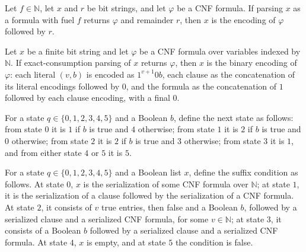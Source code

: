 \begin{theorem}
\label{Std.Sat.CNF.parseClauses_repr}
\leanok
{}
Let $f\in\mathbb{N}$, let $x$ and $r$ be bit strings, and let $\varphi$ be a CNF
formula. If parsing $x$ as a formula with fuel $f$ returns $\varphi$ and remainder $r$,
then $x$ is the encoding of $\varphi$ followed by $r$.
\end{theorem}

\begin{theorem}
\label{Std.Sat.CNF.parse_repr}
\leanok
{}
Let $x$ be a finite bit string and let $\varphi$ be a CNF formula over variables indexed
by $\mathbb N$. If exact-consumption parsing of $x$ returns $\varphi$, then $x$ is the
binary encoding of $\varphi$: each literal $(v,b)$ is encoded as $1^{v+1}0b$, each
clause as the concatenation of its literal encodings followed by $0$, and the formula as
the concatenation of $1$ followed by each clause encoding, with a final $0$.
\end{theorem}

\begin{definition}
\label{Std.Sat.CNF.syntaxStep}
\leanok
For a state $q\in\{0,1,2,3,4,5\}$ and a Boolean $b$, define the next state as follows:
from state $0$ it is $1$ if $b$ is true and $4$ otherwise; from state $1$ it is $2$ if
$b$ is true and $0$ otherwise; from state $2$ it is $2$ if $b$ is true and $3$
otherwise; from state $3$ it is $1$, and from either state $4$ or $5$ it is $5$.
\end{definition}

\begin{definition}
\label{Std.Sat.CNF.SyntaxSuffix}
\leanok
{}
For a state $q\in\{0,1,2,3,4,5\}$ and a Boolean list $x$, define the suffix condition as
follows. At state $0$, $x$ is the serialization of some CNF formula over $\mathbb N$; at
state $1$, it is the serialization of a clause followed by the serialization of a CNF
formula. At state $2$, it consists of $v$ true entries, then false and a Boolean $b$,
followed by a serialized clause and a serialized CNF formula, for some $v\in\mathbb N$;
at state $3$, it consists of a Boolean $b$ followed by a serialized clause and a
serialized CNF formula. At state $4$, $x$ is empty, and at state $5$ the condition is
false.
\end{definition}

